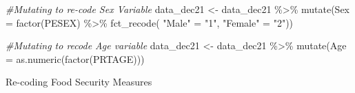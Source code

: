 \documentclass[
]{article}
\newenvironment{Shaded}{\begin{snugshade}}{\end{snugshade}}
\newcommand{\AttributeTok}[1]{\textcolor[rgb]{0.77,0.63,0.00}{#1}}
\newcommand{\CommentTok}[1]{\textcolor[rgb]{0.56,0.35,0.01}{\textit{#1}}}
\newcommand{\FunctionTok}[1]{\textcolor[rgb]{0.00,0.00,0.00}{#1}}
\newcommand{\NormalTok}[1]{#1}
\newcommand{\OtherTok}[1]{\textcolor[rgb]{0.56,0.35,0.01}{#1}}
\newcommand{\SpecialCharTok}[1]{\textcolor[rgb]{0.00,0.00,0.00}{#1}}
\newcommand{\StringTok}[1]{\textcolor[rgb]{0.31,0.60,0.02}{#1}}
\begin{document}
\begin{Shaded}
\begin{Highlighting}[]
\CommentTok{\#Mutating to re{-}code Sex Variable }
\NormalTok{data\_dec21 }\OtherTok{\textless{}{-}}\NormalTok{ data\_dec21 }\SpecialCharTok{\%\textgreater{}\%} 
  \FunctionTok{mutate}\NormalTok{(}\AttributeTok{Sex =} \FunctionTok{factor}\NormalTok{(PESEX) }\SpecialCharTok{\%\textgreater{}\%} 
    \FunctionTok{fct\_recode}\NormalTok{(}
      \StringTok{"Male"} \OtherTok{=} \StringTok{"1"}\NormalTok{,}
      \StringTok{"Female"} \OtherTok{=} \StringTok{"2"}\NormalTok{))     }

\CommentTok{\#Mutating to recode Age variable}
\NormalTok{ data\_dec21 }\OtherTok{\textless{}{-}}\NormalTok{ data\_dec21 }\SpecialCharTok{\%\textgreater{}\%} 
  \FunctionTok{mutate}\NormalTok{(}\AttributeTok{Age =} \FunctionTok{as.numeric}\NormalTok{(}\FunctionTok{factor}\NormalTok{(PRTAGE)))}
\end{Highlighting}
\end{Shaded}

Re-coding Food Security Measures
\end{document}
